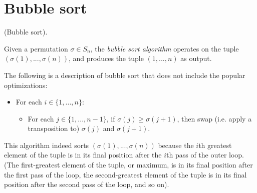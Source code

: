 \section*{Bubble sort}

\begin{defn}
\label{ch::appendix::defn::bubble_sort}
    (Bubble sort).
    
    Given a permutation $\sigma \in S_n$, the \textit{bubble sort algorithm} operates on the tuple $(\sigma(1), ..., \sigma(n))$, and produces the tuple $(1, ..., n)$ as output.
    
    The following is a description of bubble sort that does not include the popular optimizations:
    
    \begin{itemize}
        \item For each $i \in \{1, ..., n\}$:
        \begin{itemize}
            \item For each $j \in \{1, ..., n - 1\}$, if $\sigma(j) \geq \sigma(j + 1)$, then swap (i.e. apply a transposition to) $\sigma(j)$ and $\sigma(j + 1)$.
        \end{itemize}
    \end{itemize}
    
    This algorithm indeed sorts $(\sigma(1), ..., \sigma(n))$ because the $i$th greatest element of the tuple is in its final position after the $i$th pass of the outer loop. (The first-greatest element of the tuple, or maximum, is in its final position after the first pass of the loop, the second-greatest element of the tuple is in its final position after the second pass of the loop, and so on).
\end{defn}